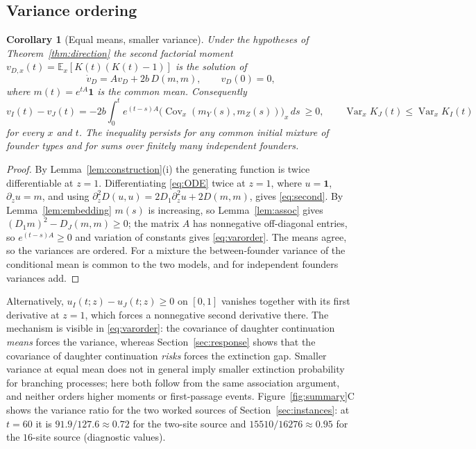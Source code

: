 \documentclass[11pt]{article}
\newtheorem{corollary}[theorem]{Corollary}
\theoremstyle{remark}
\newcommand{\one}{\mathbf 1}
\newcommand{\E}{\mathbb E}
\newcommand{\Cov}{\operatorname{Cov}}
\newcommand{\Var}{\operatorname{Var}}
\begin{document}
\subsection{Variance ordering}
\begin{corollary}[Equal means, smaller variance]\label{cor:variance}
Under the hypotheses of Theorem~\ref{thm:direction} the second factorial
moment $v_{D,x}(t)=\E_x[K(t)(K(t)-1)]$ is the solution of
\begin{equation}\label{eq:second}
 \dot v_D=Av_D+2b\,D(m,m),\qquad v_D(0)=0,
\end{equation}
where $m(t)=e^{tA}\one$ is the common mean. Consequently
\begin{equation}\label{eq:varorder}
 v_I(t)-v_J(t)=-2b\int_0^te^{(t-s)A}\bigl(\Cov_x(m_Y(s),m_Z(s))\bigr)_x\,ds\ \ge0,
 \qquad \Var_xK_J(t)\le\Var_xK_I(t)
\end{equation}
for every $x$ and $t$. The inequality persists for any common initial mixture
of founder types and for sums over finitely many independent founders.
\end{corollary}
\begin{proof}
By Lemma~\ref{lem:construction}(i) the generating function is twice
differentiable at $z=1$. Differentiating \eqref{eq:ODE} twice at $z=1$, where
$u=\one$, $\partial_zu=m$, and using
$\partial_z^2D(u,u)=2D_1\partial_z^2u+2D(m,m)$, gives \eqref{eq:second}. By
Lemma~\ref{lem:embedding} $m(s)$ is increasing, so Lemma~\ref{lem:assoc}
gives $(D_1m)^2-D_J(m,m)\ge0$; the matrix $A$ has nonnegative off-diagonal
entries, so $e^{(t-s)A}\ge0$ and variation of constants gives
\eqref{eq:varorder}. The means agree, so the variances are ordered. For a
mixture the between-founder variance of the conditional mean is common to the
two models, and for independent founders variances add.
\end{proof}
Alternatively, $u_I(t;z)-u_J(t;z)\ge0$ on $[0,1]$ vanishes together with its
first derivative at $z=1$, which forces a nonnegative second derivative
there. The mechanism is visible in \eqref{eq:varorder}: the covariance of
daughter continuation \emph{means} forces the variance, whereas
Section~\ref{sec:response} shows that the covariance of daughter continuation
\emph{risks} forces the extinction gap. Smaller variance at equal mean does
not in general imply smaller extinction probability for branching processes;
here both follow from the same association argument, and neither orders
higher moments or first-passage events. Figure~\ref{fig:summary}C shows the
variance ratio for the two worked sources of Section~\ref{sec:instances}: at
$t=60$ it is $91.9/127.6\approx0.72$ for the two-site source and
$15510/16276\approx0.95$ for the $16$-site source (diagnostic values).
\end{document}
